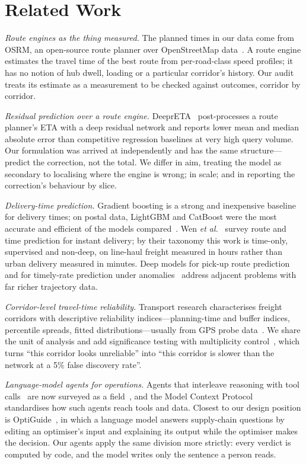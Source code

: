 \documentclass[conference]{IEEEtran}
\begin{document}
\section{Related Work}

\textit{Route engines as the thing measured.} The planned times in our data come from OSRM, an open-source route planner over OpenStreetMap data~\cite{osrm}. A route engine estimates the travel time of the best route from per-road-class speed profiles; it has no notion of hub dwell, loading or a particular corridor's history. Our audit treats its estimate as a measurement to be checked against outcomes, corridor by corridor.

\textit{Residual prediction over a route engine.} DeeprETA~\cite{deepreta} post-processes a route planner's ETA with a deep residual network and reports lower mean and median absolute error than competitive regression baselines at very high query volume. Our formulation was arrived at independently and has the same structure---predict the correction, not the total. We differ in aim, treating the model as secondary to localising where the engine is wrong; in scale; and in reporting the correction's behaviour by slice.

\textit{Delivery-time prediction.} Gradient boosting is a strong and inexpensive baseline for delivery times; on postal data, LightGBM and CatBoost were the most accurate and efficient of the models compared~\cite{khiari2020}. Wen \textit{et al.}~\cite{wen2023survey} survey route and time prediction for instant delivery; by their taxonomy this work is time-only, supervised and non-deep, on line-haul freight measured in hours rather than urban delivery measured in minutes. Deep models for pick-up route prediction~\cite{drl4route} and for timely-rate prediction under anomalies~\cite{deepsta} address adjacent problems with far richer trajectory data.

\textit{Corridor-level travel-time reliability.} Transport research characterises freight corridors with descriptive reliability indices---planning-time and buffer indices, percentile spreads, fitted distributions---usually from GPS probe data~\cite{fhwa}. We share the unit of analysis and add significance testing with multiplicity control~\cite{welch1947,bh1995}, which turns ``this corridor looks unreliable'' into ``this corridor is slower than the network at a 5\% false discovery rate''.

\textit{Language-model agents for operations.} Agents that interleave reasoning with tool calls~\cite{react} are now surveyed as a field~\cite{wang2024survey}, and the Model Context Protocol~\cite{mcp} standardises how such agents reach tools and data. Closest to our design position is OptiGuide~\cite{optiguide}, in which a language model answers supply-chain questions by editing an optimiser's input and explaining its output while the optimiser makes the decision. Our agents apply the same division more strictly: every verdict is computed by code, and the model writes only the sentence a person reads.
\end{document}
